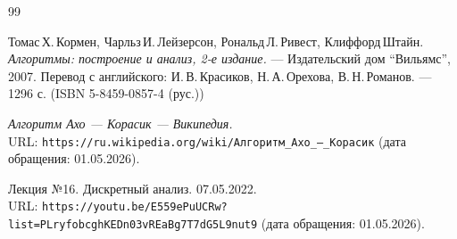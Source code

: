 \begin{thebibliography}{99}

Томас\,Х.\,Кормен, Чарльз\,И.\,Лейзерсон, Рональд\,Л.\,Ривест, Клиффорд\,Штайн.
{\itshape Алгоритмы: построение и анализ, 2-е издание.} --- Издательский дом \enquote{Вильямс}, 2007. Перевод с английского: И.\,В.\,Красиков, Н.\,А.\,Орехова, В.\,Н.\,Романов. --- 1296 с. (ISBN 5-8459-0857-4 (рус.))

{\itshape Алгоритм Ахо — Корасик — Википедия.} \\URL: \texttt{https://ru.wikipedia.org/wiki/Алгоритм\_Ахо\_—\_Корасик} (дата обращения: 01.05.2026).

Лекция №16. Дискретный анализ. 07.05.2022. \\URL: \texttt{https://youtu.be/E559ePuUCRw?list=PLryfobcghKEDn03vREaBg7T7dG5L9nut9} (дата обращения: 01.05.2026).
\end{thebibliography}
\pagebreak


